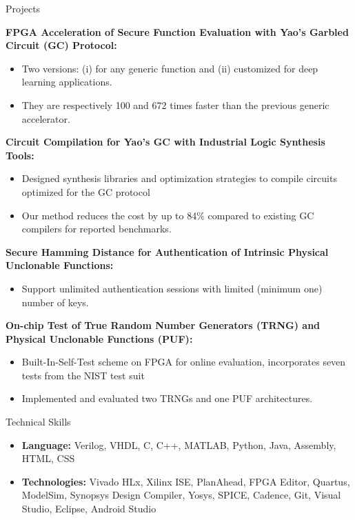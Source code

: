 \begin{cvsection}{Projects}
	\begin{cvsubsection}{}{}{}
	\textbf{FPGA Acceleration of Secure Function Evaluation with Yao's Garbled Circuit (GC) Protocol:}
		\begin{itemize}
			\item  Two versions: (i) for any generic function and (ii) customized for deep learning applications. 
			\item  They are respectively 100 and 672 times faster than the previous generic accelerator. 
		\end{itemize}
		\vspace{0.3em}
		\textbf{Circuit Compilation for Yao's GC with Industrial Logic Synthesis Tools:}
		\begin{itemize}
			\item  Designed synthesis libraries and optimization strategies to compile circuits optimized for the GC protocol
			\item Our method reduces the cost by up to 84$\%$ compared to existing GC compilers for reported benchmarks.
		\end{itemize}
		\vspace{0.3em}
		\textbf{Secure Hamming Distance for Authentication of Intrinsic Physical Unclonable Functions:}
		\begin{itemize}
		    \item Support unlimited authentication sessions with limited (minimum one) number of keys.  
		\end{itemize}
		\vspace{0.3em}
% 			
		\textbf{On-chip Test of True Random Number Generators (TRNG) and Physical Unclonable Functions (PUF):}
		\begin{itemize}
		    \item Built-In-Self-Test scheme on FPGA for online evaluation, incorporates seven tests from the NIST test suit 
			\item Implemented and evaluated two TRNGs and one PUF architectures.  
		\end{itemize}
	\end{cvsubsection}
\end{cvsection}
\vspace{-0.3em}
\begin{cvsection}{Technical Skills}
	\begin{cvsubsection}{}{}{}	
		\begin{itemize}
			\item \textbf{Language:} Verilog, VHDL, C, C++, MATLAB, Python, Java, Assembly, HTML, CSS 
			\vspace{0.3em}
			\item \textbf{Technologies:} Vivado HLx, Xilinx ISE, PlanAhead, FPGA Editor, Quartus, ModelSim, Synopsys Design Compiler, Yosys,  SPICE, Cadence, Git, Visual Studio, Eclipse, Android Studio
		\end{itemize}
	\end{cvsubsection}
\end{cvsection}
